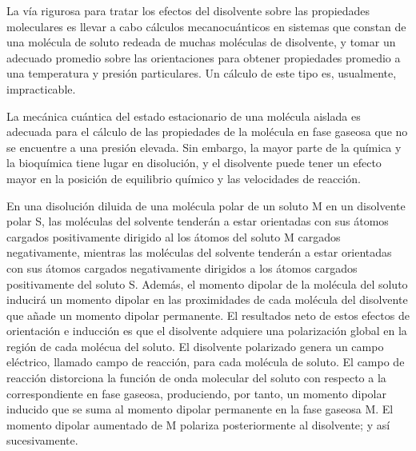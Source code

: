 
La v\'ia rigurosa para tratar los efectos del disolvente sobre las
propiedades moleculares es llevar a cabo c\'alculos mecanocu\'anticos
en sistemas que constan de una mol\'ecula de soluto redeada de muchas
mol\'eculas de disolvente, y tomar un adecuado promedio sobre las 
orientaciones para obtener propiedades promedio a una temperatura y
presi\'on particulares. Un c\'alculo de este tipo es, usualmente,
impracticable.

La mec\'anica cu\'antica del estado estacionario de una mol\'ecula
aislada es adecuada para el c\'alculo de las propiedades de la 
mol\'ecula en fase gaseosa que no se encuentre a una presi\'on 
elevada. Sin embargo, la mayor parte de la qu\'imica y la 
bioqu\'imica tiene lugar en disoluci\'on, y el disolvente puede 
tener un efecto mayor en la posici\'on de equilibrio qu\'imico y las
velocidades de reacci\'on. 

En una disoluci\'on diluida de una mol\'ecula polar de un soluto M en
un disolvente polar S, las mol\'eculas del solvente tender\'an a 
estar orientadas con sus \'atomos cargados positivamente dirigido al
los \'atomos del soluto M cargados negativamente, mientras las 
mol\'eculas del solvente tender\'an a estar orientadas con sus 
\'atomos cargados negativamente dirigidos a los \'atomos cargados 
positivamente del soluto S. Adem\'as, el momento dipolar de la 
mol\'ecula del soluto inducir\'a un momento dipolar en las 
proximidades de cada mol\'ecula del disolvente que a\~nade un momento
dipolar permanente. El resultados neto de estos efectos de 
orientaci\'on e inducci\'on es que el disolvente adquiere una 
polarizaci\'on global en la regi\'on de cada mol\'ecua del soluto. El
disolvente polarizado genera un campo el\'ectrico, llamado campo de
reacci\'on, para cada mol\'ecula de soluto. El campo de reacci\'on
distorciona la funci\'on de onda molecular del soluto con respecto a
la correspondiente en fase gaseosa, produciendo, por tanto, un 
momento dipolar inducido que se suma al momento dipolar permanente en
la fase gaseosa M. El momento dipolar aumentado de M polariza 
posteriormente al disolvente; y as\'i sucesivamente.

